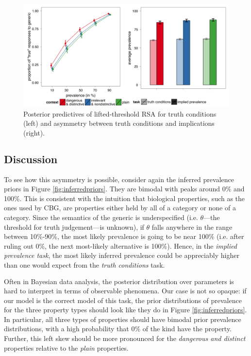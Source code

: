 \documentclass[10pt,letterpaper]{article}
\begin{document}
\begin{figure}
\centering
    \includegraphics[width=\columnwidth]{lvRSA_postpreds}
    \caption{Posterior predictives of lifted-threshold RSA for truth conditions (left) and asymmetry between truth conditions and implications (right).}
  \label{fig:lvRSAposteriorpred}
\end{figure}

\subsection{Discussion}

To see how this asymmetry is possible, consider again the inferred prevalence priors in Figure \ref{fig:inferredpriors}. They are bimodal with peaks around 0\% and 100\%. This is consistent with the intuition that biological properties, such as the ones used by CBG, are properties either held by all of a category or none of a category. Since the semantics of the generic is underspecified (i.e. $\theta$---the threshold for truth judgement---is unknown), if $\theta$ falls anywhere in the range between 10\%-90\%, the most likely prevalence is going to be near 100\% (i.e. after ruling out 0\%, the next most-likely alternative is 100\%). Hence, in the \emph{implied prevalence task}, the most likely inferred prevalence could be appreciably higher than one would expect from the \emph{truth conditions} task. 





Often in Bayesian data analysis, the posterior distribution over parameters is hard to interpret in terms of observable phenomena. Our case is not so opaque: if our model is the correct model of this task, the prior distributions of prevalence for the three property types should look like they do in Figure \ref{fig:inferredpriors}. 
In particular, all three types of properties should have bimodal prior prevalence distributions, with a high probability that 0\% of the kind have the property. Further, this left skew should be more pronounced for the \emph{dangerous and distinct} properties relative to the \emph{plain} properties. 
\end{document}
